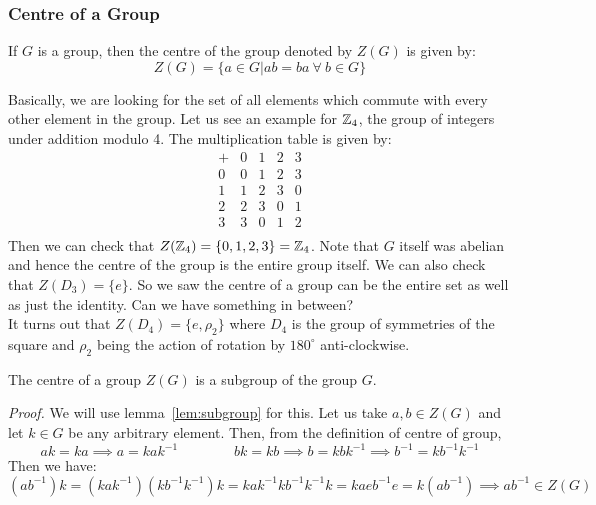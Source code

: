 \subsubsection{Centre of a Group}
\begin{definition}[Centre]
    If $G$ is a group, then the centre of the group denoted by $Z(G)$ is given by:
    $$Z(G) = \{a\in G| ab=ba \ \forall \ b\in G\}$$
\end{definition}
Basically, we are looking for the set of all elements which commute with every other element in the group. Let us see an example for $\mathbb{Z}_4$, the group of integers under addition modulo 4. The multiplication table is given by:
\[
\begin{array}{c|cccc}
  + & 0 & 1 & 2 & 3 \\
  \hline
  0 & 0 & 1 & 2 & 3 \\
  1 & 1 & 2 & 3 & 0 \\
  2 & 2 & 3 & 0 & 1 \\
  3 & 3 & 0 & 1 & 2 \\
\end{array}
\]
Then we can check that $Z(\mathbb{Z}_4) = \{0,1,2,3\}=\mathbb{Z}_4$. Note that $G$ itself was abelian and hence the centre of the group is the entire group itself. We can also check that $Z(D_3) = \{e\}$. So we saw the centre of a group can be the entire set as well as just the identity. Can we have something in between? \\[0.3cm]
It turns out that $Z(D_4) = \{e,\rho_2\}$ where $D_4$ is the group of symmetries of the square and $\rho_2$ being the action of rotation by $180^\circ$ anti-clockwise.
\begin{lemma}
    The centre of a group $Z(G)$ is a subgroup of the group $G$. 
\end{lemma}
\textit{Proof.} We will use lemma~\ref{lem:subgroup} for this. Let us take $a,b\in Z(G)$ and let $k\in G$ be any arbitrary element. Then, from the definition of centre of group, 
$$ak = ka\implies a = kak^{-1} \qquad \qquad bk = kb\implies b = kbk^{-1}\implies b^{-1} = kb^{-1}k^{-1}$$
Then we have:
$$(ab^{-1})k = (kak^{-1})(kb^{-1}k^{-1})k = kak^{-1}k b^{-1}k^{-1}k = kaeb^{-1}e = k (ab^{-1})\implies ab^{-1}\in Z(G)$$
